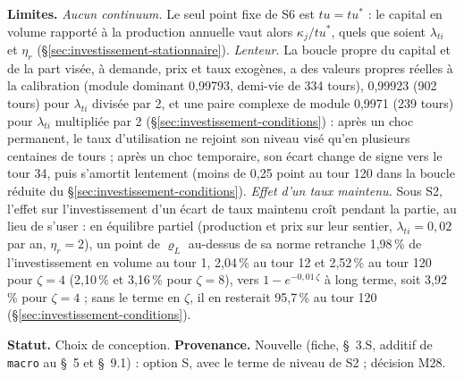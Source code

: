 \documentclass[11pt,a4paper]{article}
\newcommand{\limites}{\par\noindent\textbf{Limites.} }
\begin{document}
\begin{proposee}
\limites \emph{Aucun continuum.} Le seul point fixe de S6 est $\mathit{tu} = \mathit{tu}^\ast$ : le capital en volume rapporté à la production annuelle vaut alors $\kappa_j/\mathit{tu}^\ast$, quels que soient $\lambda_{\mathit{ti}}$ et $\eta_r$ (\S\ref{sec:investissement-stationnaire}). \emph{Lenteur.} La boucle propre du capital et de la part visée, à demande, prix et taux exogènes, a des valeurs propres réelles à la calibration (module dominant 0,99793, demi-vie de 334 tours), 0,99923 (902 tours) pour $\lambda_{\mathit{ti}}$ divisée par 2, et une paire complexe de module 0,9971 (239 tours) pour $\lambda_{\mathit{ti}}$ multipliée par 2 (\S\ref{sec:investissement-conditions}) : après un choc permanent, le taux d'utilisation ne rejoint son niveau visé qu'en plusieurs centaines de tours ; après un choc temporaire, son écart change de signe vers le tour 34, puis s'amortit lentement (moins de 0,25 point au tour 120 dans la boucle réduite du \S\ref{sec:investissement-conditions}). \emph{Effet d'un taux maintenu.} Sous S2, l'effet sur l'investissement d'un écart de taux maintenu croît pendant la partie, au lieu de s'user : en équilibre partiel (production et prix sur leur sentier, $\lambda_{\mathit{ti}} = 0{,}02$ par an, $\eta_r = 2$), un point de $\varrho_L$ au-dessus de sa norme retranche 1,98\,\% de l'investissement en volume au tour 1, 2,04\,\% au tour 12 et 2,52\,\% au tour 120 pour $\zeta = 4$ (2,10\,\% et 3,16\,\% pour $\zeta = 8$), vers $1 - e^{-0{,}01\,\zeta}$ à long terme, soit 3,92\,\% pour $\zeta = 4$ ; sans le terme en $\zeta$, il en resterait 95,7\,\% au tour 120 (\S\ref{sec:investissement-conditions}).

\textbf{Statut.} Choix de conception. \textbf{Provenance.} Nouvelle (fiche, \S~3.S, additif de \texttt{macro} au \S~5 et \S~9.1) : option S, avec le terme de niveau de S2 ; décision M28.
\end{proposee}
\end{document}
